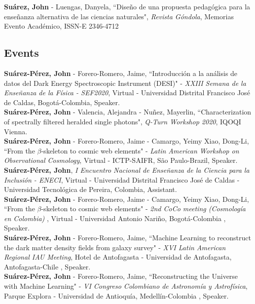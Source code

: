 \documentclass[10pt, a4paper]{article}
\newcommand{\years}[1]{\marginnote{\scriptsize #1}}
\begin{document}
\years{2014}\textbf{Suárez, John} - Luengas, Danyela, “Diseño de una propuesta pedagógica para la enseñanza alternativa de las ciencias naturales", \emph{Revista Góndola}, Memorias Evento Académico, ISSN-E 2346-4712 \\

\subsection*{Events}
\noindent
\years{2020}\textbf{Suárez-Pérez, John} - Forero-Romero, Jaime, “Introducción a la análisis de datos del Dark Energy Spectroscopic Instrument (DESI)" - \emph{XXIII Semana de la Enseñanza de la Física - SEF2020}, Virtual - Universidad Distrital Francisco José de Caldas, Bogotá-Colombia, Speaker.\\

\years{2020}\textbf{Suárez-Pérez, John} - Valencia, Alejandra - Nuñez, Mayerlin, “Characterization of spectrally filtered heralded single photons", \emph{Q-Turn Workshop 2020}, IQOQI Vienna.\\

\years{2020}\textbf{Suárez-Pérez, John} - Forero-Romero, Jaime - Camargo, Yeimy  Xiao, Dong-Li, “From the $\beta$-skeleton to cosmic web elements" - \emph{Latin American Workshop on Observational Cosmology}, Virtual - ICTP-SAIFR, São Paulo-Brazil, Speaker.\\

\years{2020}\textbf{Suárez-Pérez, John}, \emph{I Encuentro Nacional de Enseñanza de la Ciencia para la Inclusión - ENECI}, Virtual - Universidad Distrital Francisco José de Caldas - Universidad Tecnológica de Pereira, Colombia, Assistant.\\

\years{2020}\textbf{Suárez-Pérez, John} - Forero-Romero, Jaime - Camargo, Yeimy  Xiao, Dong-Li, “From the $\beta$-skeleton to cosmic web elements" - \emph{2nd CoCo meeting (Cosmología en Colombia) }, Virtual - Universidad Antonio Nariño, Bogotá-Colombia , Speaker.\\

\years{2019}\textbf{Suárez-Pérez, John} - Forero-Romero, Jaime, “Machine Learning to reconstruct the dark matter density fields from galaxy survey" - \emph{XVI Latin American Regional IAU Meeting}, Hotel de Antofagasta - Universidad de Antofagasta, Antofagasta-Chile , Speaker.\\

\years{2019}\textbf{Suárez-Pérez, John} - Forero-Romero, Jaime, “Reconstructing the Universe with Machine Learning" - \emph{VI Congreso Colombiano de Astronomía y Astrofísica}, Parque Explora - Universidad de Antioquía, Medellín-Colombia , Speaker.\\
\end{document}
